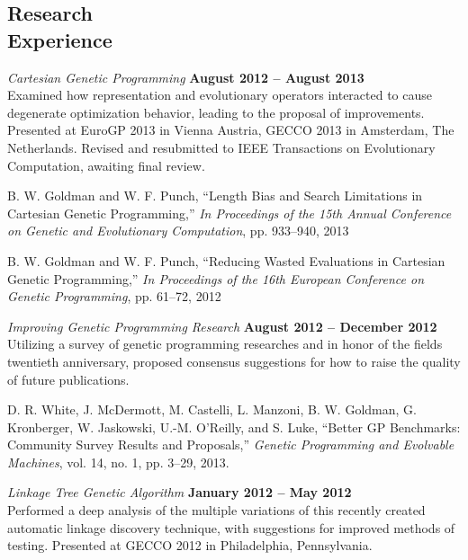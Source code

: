 \documentclass[margin,line]{resume}
\begin{document}
\begin{resume}
    \section{\mysidestyle Research\\Experience}
    
    \textsl{Cartesian Genetic Programming} \hfill \textbf{August 2012 -- August 2013}\\
    Examined how representation and evolutionary operators interacted to cause degenerate
    optimization behavior, leading to the proposal of improvements.  Presented at EuroGP 2013
    in Vienna Austria, GECCO 2013 in Amsterdam, The Netherlands.  Revised and resubmitted to
    IEEE Transactions on Evolutionary Computation, awaiting final review.
    
    \vspace{-2mm}
    B. W. Goldman and W. F. Punch,
    ``Length Bias and Search Limitations in Cartesian Genetic Programming,''
    \textsl{In Proceedings of the 15th Annual Conference on Genetic and Evolutionary Computation}, pp. 933--940, 2013

    \vspace{-2mm}
    B. W. Goldman and W. F. Punch,
    ``Reducing Wasted Evaluations in  Cartesian Genetic Programming,''
    \textsl{In Proceedings of the 16th European Conference on Genetic Programming}, pp. 61--72, 2012

    \textsl{Improving Genetic Programming Research} \hfill \textbf{August 2012 -- December 2012}\\
    Utilizing a survey of genetic programming researches and in honor of the fields twentieth anniversary,
    proposed consensus suggestions for how to raise the quality of future publications.

    \vspace{-2mm}
    D. R. White, J. McDermott, M. Castelli, L. Manzoni, B. W. Goldman,
    G. Kronberger, W. Jaskowski, U.-M. O’Reilly, and S. Luke,
    ``Better GP Benchmarks: Community Survey Results and Proposals,''
    \textsl{Genetic Programming and Evolvable Machines}, vol. 14, no. 1, pp. 3--29, 2013.    

    \textsl{Linkage Tree Genetic Algorithm} \hfill \textbf{January 2012 -- May 2012}\\
    Performed a deep analysis of the multiple variations of this recently created automatic linkage
    discovery technique, with suggestions for improved methods of testing. Presented at GECCO 2012 in Philadelphia, Pennsylvania.


\end{resume}
\end{document}
